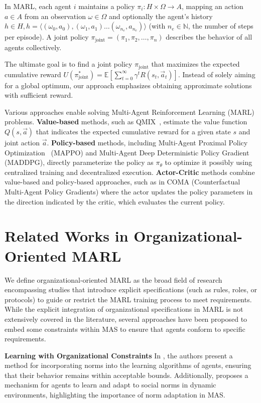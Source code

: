 \documentclass[conference]{IEEEtran}
\begin{document}
In MARL, each agent $i$ maintains a policy $\pi_i: H \times \Omega \rightarrow A$, mapping an action $a \in A$ from an observation $\omega \in \Omega$ and optionally the agent's history $h \in H, h=\langle(\omega_0,a_0),(\omega_1,a_1)\dots(\omega_{n_e},a_{n_e})\rangle$ (with $n_e \in \mathbb{N}$, the number of steps per episode). A joint policy $\pi_{\text{joint}} = (\pi_1, \pi_2, \ldots, \pi_n)$ describes the behavior of all agents collectively.

The ultimate goal is to find a joint policy $\pi_{\text{joint}}$ that maximizes the expected cumulative reward $U(\pi^*_{\text{joint}}) = \mathbb{E}\left[\sum_{t=0}^{\infty} \gamma^t R(s_t, \vec{a}_t)\right]$. Instead of solely aiming for a global optimum, our approach emphasizes obtaining approximate solutions with sufficient reward.

Various approaches enable solving Multi-Agent Reinforcement Learning (MARL) problems. \textbf{Value-based} methods, such as QMIX~\cite{rashid2018}, estimate the value function $Q(s,\vec{a})$ that indicates the expected cumulative reward for a given state $s$ and joint action $\vec{a}$. \textbf{Policy-based} methods, including Multi-Agent Proximal Policy Optimization~\cite{yu2022surprising} (MAPPO) and Multi-Agent Deep Deterministic Policy Gradient~\cite{lowe2017multi} (MADDPG), directly parameterize the policy as $\pi_\theta$ to optimize it possibly using centralized training and decentralized execution. \textbf{Actor-Critic} methods combine value-based and policy-based approaches, such as in COMA (Counterfactual Multi-Agent Policy Gradients) where the actor updates the policy parameters in the direction indicated by the critic, which evaluates the current policy.


\section{Related Works in Organizational-Oriented MARL}
\label{sec:related_works}

We define organizational-oriented MARL as the broad field of research encompassing studies that introduce explicit specifications (such as rules, roles, or protocols) to guide or restrict the MARL training process to meet requirements. While the explicit integration of organizational specifications in MARL is not extensively covered in the literature, several approaches have been proposed to embed some constraints within MAS to ensure that agents conform to specific requirements.

\textbf{Learning with Organizational Constraints} \quad
In \cite{cruz2020norms}, the authors present a method for incorporating norms into the learning algorithms of agents, ensuring that their behavior remains within acceptable bounds. Additionally, \cite{villatoro2011social} proposes a mechanism for agents to learn and adapt to social norms in dynamic environments, highlighting the importance of norm adaptation in MAS.
\end{document}
